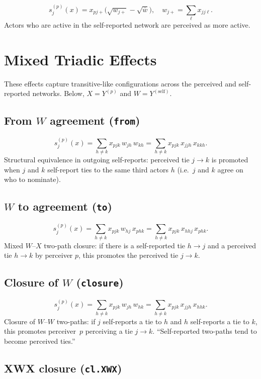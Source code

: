 \documentclass[11pt]{article}
\newcommand{\self}{\mathrm{self}}
\begin{document}
\[
  s_{j}^{(p)}(x) = x_{pj+}
    \bigl(\sqrt{w_{j+}} - \sqrt{\bar{w}}\bigr),
  \quad
  w_{j+} = \sum_{\ell} x_{jj\ell}.
\]
Actors who are active in the self-reported network are perceived as
more active.

\section{Mixed Triadic Effects}

These effects capture transitive-like configurations across the
perceived and self-reported networks.
Below, $X = Y^{(p)}$ and $W = Y^{(\self)}$.

\subsection{From $W$ agreement (\texttt{from})}

\[
  s_{j}^{(p)}(x) = \sum_{h \neq k} x_{pjk}\, w_{jh}\, w_{kh}
  = \sum_{h \neq k} x_{pjk}\, x_{jjh}\, x_{kkh}.
\]
Structural equivalence in outgoing self-reports:
perceived tie $j \to k$ is promoted when $j$ and $k$ self-report ties to
the same third actors $h$ (i.e.\ $j$ and $k$ agree on who to nominate).

\subsection{$W$ to agreement (\texttt{to})}

\[
  s_{j}^{(p)}(x) = \sum_{h \neq k} x_{pjk}\, w_{hj}\, x_{phk}
  = \sum_{h \neq k} x_{pjk}\, x_{hhj}\, x_{phk}.
\]
Mixed $W$--$X$ two-path closure:
if there is a self-reported tie $h \to j$ and a perceived tie $h \to k$
by perceiver $p$, this promotes the perceived tie $j \to k$.

\subsection{Closure of $W$ (\texttt{closure})}

\[
  s_{j}^{(p)}(x) = \sum_{h \neq k} x_{pjk}\, w_{jh}\, w_{hk}
  = \sum_{h \neq k} x_{pjk}\, x_{jjh}\, x_{hhk}.
\]
Closure of $W$--$W$ two-paths:
if $j$ self-reports a tie to $h$ and $h$ self-reports a tie to $k$,
this promotes perceiver~$p$ perceiving a tie $j \to k$.
``Self-reported two-paths tend to become perceived ties.''

\subsection{XWX closure (\texttt{cl.XWX})}
\end{document}
